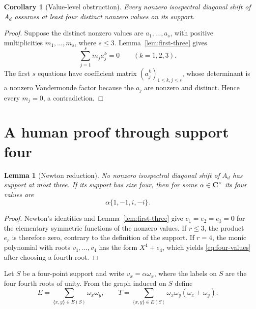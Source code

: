 \documentclass[11pt,reqno]{amsart}
\newtheorem{lemma}[theorem]{Lemma}
\newtheorem{corollary}[theorem]{Corollary}
\theoremstyle{definition}
\theoremstyle{remark}
\newcommand{\C}{\mathbf C}
\begin{document}
\begin{corollary}[Value-level obstruction]\label{cor:value-levels}
Every nonzero isospectral diagonal shift of $A_d$ assumes at least four
distinct nonzero values on its support.
\end{corollary}

\begin{proof}
Suppose the distinct nonzero values are $a_1,\ldots,a_s$, with positive
multiplicities $m_1,\ldots,m_s$, where $s\leq3$.  Lemma~\ref{lem:first-three}
gives
\[
 \sum_{j=1}^s m_j a_j^k=0\qquad(k=1,2,3).
\]
The first $s$ equations have coefficient matrix
$(a_j^k)_{1\leq k,j\leq s}$, whose determinant is a nonzero Vandermonde
factor because the $a_j$ are nonzero and distinct.  Hence every $m_j=0$, a
contradiction.
\end{proof}

\section{A human proof through support four}

\begin{lemma}[Newton reduction]\label{lem:newton}
No nonzero isospectral diagonal shift of $A_d$ has support at most three.
If its support has size four, then for some $\alpha\in\C^\times$ its four
values are
\begin{equation}\label{eq:four-values}
 \alpha\{1,-1,i,-i\}.
\end{equation}
\end{lemma}

\begin{proof}
Newton's identities and Lemma~\ref{lem:first-three} give
$e_1=e_2=e_3=0$ for the elementary symmetric functions of the nonzero
values.  If $r\leq3$, the product $e_r$ is therefore zero, contrary to the
definition of the support.  If $r=4$, the monic polynomial with roots
$v_1,\ldots,v_4$ has the form $X^4+e_4$, which yields
\eqref{eq:four-values} after choosing a fourth root.
\end{proof}

Let $S$ be a four-point support and write
$v_x=\alpha\omega_x$, where the labels on $S$ are the four fourth roots of
unity.  From the graph induced on $S$ define
\begin{equation}\label{eq:ET}
 E=\sum_{\{x,y\}\in E(S)}\omega_x\omega_y,
 \qquad
 T=\sum_{\{x,y\}\in E(S)}
 \omega_x\omega_y(\omega_x+\omega_y).
\end{equation}
\end{document}
